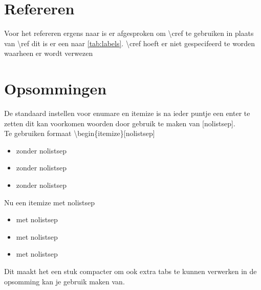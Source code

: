 \documentclass[a4paper, twoside, 10pt]{article}
\begin{document}
\section{Refereren}
Voor het refereren ergens naar is er afgesproken om \textbackslash cref te gebruiken in plaats van \textbackslash ref dit is er een naar \cref{tab:labels}. \textbackslash cref hoeft er niet gespecifeerd te worden waarheen er wordt verwezen
\section{Opsommingen}
De standaard instellen voor enumare en itemize is na ieder puntje een enter te zetten dit kan voorkomen woorden door gebruik te maken van [nolistsep]. \\
Te gebruiken formaat \textbackslash begin\{itemize\}[nolistsep]
\begin{itemize}
\item zonder nolistsep
\item zonder nolistsep
\item zonder nolistsep
\end{itemize}
Nu een itemize met nolistsep
\begin{itemize}[nolistsep]
\item met nolistsep
\item met nolistsep
\item met nolistsep \\
\end{itemize}

\noindent Dit maakt het een stuk compacter om ook extra tabs te kunnen verwerken in de opsomming kan je gebruik maken van.
\end{document}
